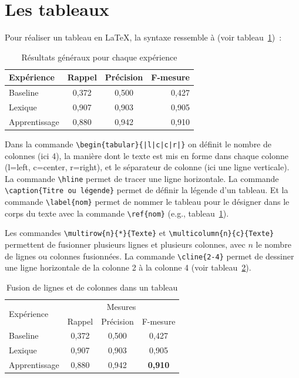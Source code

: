 
\newpage
\section{Les tableaux}
\label{sec:tableaux}

Pour réaliser un  tableau en \LaTeX{}, la syntaxe
ressemble à (voir tableau~\ref{tab:exemple})~:
%
\begin{table}[h]
  \centering
  \begin{tabular}{|l|c|c|r|} \hline
    Expérience & Rappel & Précision & F-mesure \\ \hline
    Baseline & 0,372 & 0,500 & 0,427 \\
    Lexique & 0,907 & 0,903 & 0,905 \\
    Apprentissage & 0,880 & 0,942 & 0,910 \\ \hline
  \end{tabular}
  \caption{Résultats généraux pour chaque expérience}
  \label{tab:exemple}
\end{table}

Dans la commande \verb+\begin{tabular}{|l|c|c|r|}+ on définit le
  nombre de colonnes (ici 4), la manière dont le texte est mis en
  forme dans chaque colonne (l=left, c=center, r=right), et le
  séparateur de colonne (ici une ligne verticale). La commande
  \verb+\hline+ permet de tracer une ligne horizontale. La commande
  \verb+\caption{Titre ou légende}+ permet de définir la légende d'un
  tableau. Et la commande \verb+\label{nom}+ permet de nommer le
  tableau pour le désigner dans le corps du texte avec la commande
  \verb+\ref{nom}+ (e.g., tableau~\ref{tab:exemple}).

Les commandes \verb+\multirow{n}{*}{Texte}+ et
\verb+\multicolumn{n}{c}{Texte}+ permettent de fusionner plusieurs
lignes et plusieurs colonnes, avec $n$ le nombre de lignes ou colonnes
fusionnées. La commande \verb+\cline{2-4}+ permet de dessiner une
ligne horizontale de la colonne 2 à la colonne 4 (voir tableau~\ref{tab:autre}).
%
\begin{table}[h]
  \centering
  \begin{tabular}{|l|ccc|} \hline
    \multirow{2}{*}{Expérience} & \multicolumn{3}{c|}{Mesures} \\ \cline{2-4}
    & Rappel & Précision & F-mesure \\ \hline
    Baseline & 0,372 & 0,500 & 0,427 \\
    Lexique & 0,907 & 0,903 & 0,905 \\
    Apprentissage & 0,880 & 0,942 & \textbf{0,910} \\ \hline
  \end{tabular}
  \caption{Fusion de lignes et de colonnes dans un tableau}
  \label{tab:autre}
\end{table}


